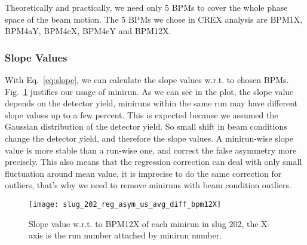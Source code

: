 \begin{comment}
For multiple detectors, it is easy to get:
\begin{equation}
    \small
    \begin{aligned}
	\begin{pmatrix}
	    \beta_{11}	& \beta_{21}    & \cdots & \beta_{m1}	\\
	    \beta_{12}	& \beta_{22}    & \cdots & \beta_{m2}	\\
	    \vdots	& \vdots    & \ddots	& \vdots\\
	    \beta_{1n}	& \beta_{2n}    & \cdots & \beta_{mn}	\\
	\end{pmatrix}
	&= A^{-1}
	&\times
	\begin{pmatrix}
	    cov(\Delta D^1, \Delta M^1) & cov(\Delta D^2, \Delta M^1)   & \cdots	& cov(\Delta D^m, \Delta M^1)	\\
	    cov(\Delta D^1, \Delta M^2) & cov(\Delta D^2, \Delta M^2)   & \cdots	& cov(\Delta D^m, \Delta M^2)	\\
	    \vdots	& \vdots    & \ddots	& \vdots    \\
	    cov(\Delta D^1, \Delta M^n) & cov(\Delta D^2, \Delta M^n)   & \cdots	& cov(\Delta D^m, \Delta M^n)	\\
	\end{pmatrix}
    \end{aligned}
    \label{eq:slope}
\end{equation}
where $\beta_{ij}$ refers to detector i's response to change in monitor j.
\end{comment}

Theoretically and practically, we need only 5 BPMs to cover the whole phase space of 
the beam motion.
The 5 BPMs we chose in CREX analysis are BPM1X, BPM4aY, BPM4eX, BPM4eY and BPM12X.

\subsubsection{Slope Values}
With Eq.~\ref{eq:slope}, we can calculate the slope values w.r.t. to chosen 
BPMs. Fig.~\ref{fig:slug_202_reg_asym_us_avg_diff_bpm12X} justifies our usage
of minirun. As we can see in the plot, the slope value depends on the detector 
yield, miniruns within the same run may have different slope values up to a few 
percent. This is expected because we assumed the Gaussian distribution
of the detector yield. So small shift in beam conditions change the detector
yield, and therefore the slope values. A minirun-wise slope value is more stable
than a run-wise one, and correct the false asymmetry more precisely. This also
means that the regression correction can deal with only small fluctuation around 
mean value, it is imprecise to do the same correction for outliers, that's why
we need to remove miniruns with beam condition outliers.
\begin{figure}[H]
    \centering
    \texttt{[image: slug\_202\_reg\_asym\_us\_avg\_diff\_bpm12X]}
    \caption{Slope value w.r.t. to BPM12X of each minirun in slug 202, the X-axis 
    is the run number attached by minirun number.}
    \label{fig:slug_202_reg_asym_us_avg_diff_bpm12X}
\end{figure}

